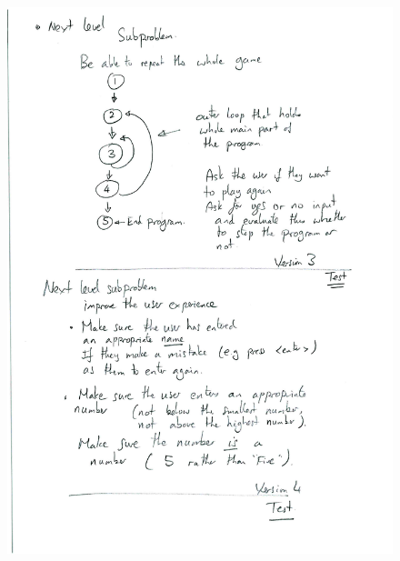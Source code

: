 \documentclass[a4paper,12pt]{article}
\begin{document}
\newpage
\begin{figure} [!h]
	\centering
	\includegraphics[width=17cm]{iterative_processes/higherlowerplanning-2.pdf}
\end{figure}



\newpage
\end{document}
